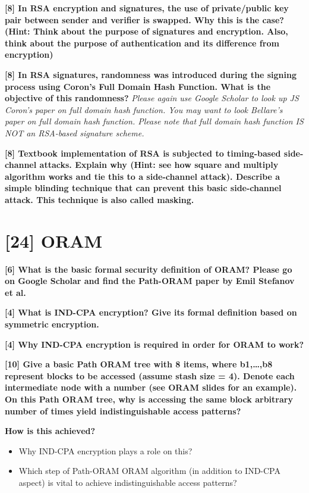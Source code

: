 \documentclass[letterpaper,11pt,notitlepage,fleqn]{article}
\begin{document}
\noindent \textbf{[8]  In  RSA  encryption  and  signatures,  the  use  of  private/public  key  pair  between sender  and  verifier  is  swapped.  Why  this  is  the  case?  (Hint:  Think  about  the purpose  of  signatures  and  encryption.  Also,  think  about  the  purpose  of authentication and its difference from encryption)}

\noindent \textbf{[8]  In  RSA  signatures,  randomness  was  introduced  during  the  signing  process using  Coron’s  Full  Domain  Hash  Function.  What  is  the  objective  of  this randomness?} \textit{Please again use Google Scholar to look up JS Coron’s paper on full domain hash  function. You may want  to  look Bellare’s paper on  full domain hash function.  Please  note  that  full  domain  hash  function  IS  NOT  an  RSA-based signature scheme.}

\noindent \textbf{[8]  Textbook  implementation  of  RSA    is  subjected  to  timing-based  side-channel attacks. Explain why  (Hint:  see how  square  and multiply  algorithm works  and  tie this  to  a  side-channel  attack).  Describe  a  simple  blinding  technique  that  can prevent this basic side-channel attack. This technique is also called masking.}


\section{[24] ORAM}



\noindent \textbf{[6] What is the basic formal security definition of ORAM? Please go on Google Scholar and find the Path-ORAM paper by Emil Stefanov et al.} 



\noindent \textbf{[4] What is IND-CPA encryption? Give its formal definition based on symmetric encryption.}



\noindent \textbf{[4] Why IND-CPA encryption is required in order for ORAM to work?}


\noindent \textbf{[10] Give a basic Path ORAM tree with 8 items, where b1,…,b8 represent blocks to be accessed (assume stash size = 4). Denote each intermediate node with a number (see ORAM slides for an example). On this Path ORAM tree, why is accessing the same block arbitrary number of times yield indistinguishable access patterns?} 

\noindent \textbf{How is this achieved?}
\begin{itemize}
    \item Why IND-CPA encryption plays a role on this?
    \item Which  step  of  Path-ORAM  ORAM  algorithm  (in  addition  to  IND-CPA aspect) is vital to achieve indistinguishable access patterns?
\end{itemize}

\medskip


\end{document}
